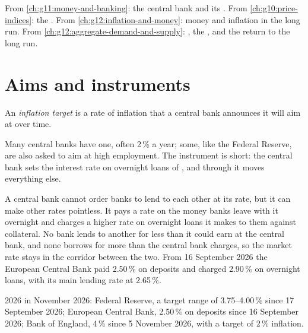 \begin{recall}
From \cref{ch:g11:money-and-banking}: the central bank and its . From \cref{ch:g10:price-indices}: the . From \cref{ch:g12:inflation-and-money}:
money and inflation in the long run. From \cref{ch:g12:aggregate-demand-and-supply}: , the , and the return to the long run.
\end{recall}

\section{Aims and instruments}\label{sec:g12:monetary-policy:aims}

\begin{definition}\label{def:g12:monetary-policy:inflation-target}
An \emph{inflation target} is a rate of inflation that a central bank announces it will aim at over time.
\end{definition}

Many central banks have one, often 2\,\% a year; some, like the Federal Reserve, are also asked to aim at high employment. The instrument is short: the central bank sets the
interest rate on overnight loans of , and through it moves everything else.

\begin{measure}
A central bank cannot order banks to lend to each other at its rate, but it can make other rates pointless. It pays a rate on the money banks leave with it overnight and
charges a higher rate on overnight loans it makes to them against collateral. No bank lends to another for less than it could earn at the central bank, and none borrows
for more than the central bank charges, so the market rate stays in the corridor between the two. From 16 September 2026 the European Central Bank paid 2.50\,\% on
deposits and charged 2.90\,\% on overnight loans, with its main lending rate at 2.65\,\%.
\end{measure}

\begin{dated}{2026}
 in November 2026: Federal Reserve, a target range of 3.75--4.00\,\% since 17 September 2026; European Central Bank, 2.50\,\% on deposits since 16 September
2026; Bank of England, 4\,\% since 5 November 2026, with a target of 2\,\% inflation.
\end{dated}

